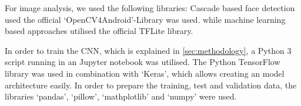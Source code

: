 For image analysis, we used the following libraries: Cascade based face
detection used the official `OpenCV4Android'-Library was used\cite{opencv4android}.
while machine learning based approaches utilised the official TFLite library.
\cite{tensorflow}

In order to train the CNN, which is explained in \ref{sec:methodology}, a
Python 3 script running in an Jupyter notebook was utilised. 
The Python TensorFlow library was used in combination with `Keras',
which allows creating an model architecture easily. In order to prepare the
training, test and validation data, the libraries `pandas', `pillow', 
`mathplotlib' and `numpy' were used.
